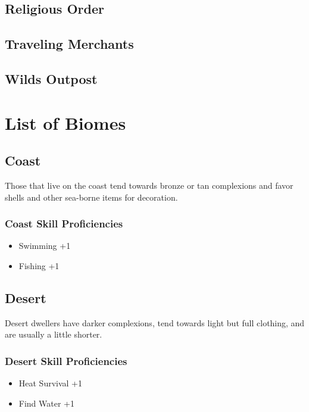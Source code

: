 \begin{multicols}{2}
\subsection{Religious Order}
\subsection{Traveling Merchants}
\subsection{Wilds Outpost}

\section{List of Biomes}

\subsection{Coast}

Those that live on the coast tend towards bronze or tan complexions
and favor shells and other sea-borne items for decoration.

\subsubsection{Coast Skill Proficiencies}

\begin{itemize}
    \item Swimming +1
    \item Fishing +1
\end{itemize}

\subsection{Desert}

Desert dwellers have darker complexions, tend towards light but full
clothing, and are usually a little shorter.

\subsubsection{Desert Skill Proficiencies}

\begin{itemize}
    \item Heat Survival +1
    \item Find Water +1
\end{itemize}


\end{multicols}

